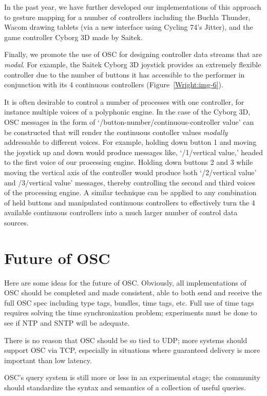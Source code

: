 In the past year, we have further developed our implementations of this approach
to gesture mapping for a number of controllers including the Buchla Thunder,
Wacom drawing tablets (via a new interface using Cycling 74's Jitter), and the
game controller Cyborg 3D made by Saitek.

Finally, we promote the use of OSC for designing controller data streams that
are \textit{modal}.  For example, the Saitek Cyborg 3D joystick provides an
extremely flexible controller due to the number of buttons it has accessible to
the performer in conjunction with its 4 continuous controllers (Figure~\ref{Wright:img-6}).

It
is often desirable to control a number of processes with one controller, for
instance multiple voices of a polyphonic engine.  In the case of the Cyborg 3D,
OSC messages in the form of `/button-number/continuous-controller value' can be
constructed that will render the continuous contoller values \textit{modally}
addressable to different voices.  For example, holding down button 1 and moving
the joystick up and down would produce messages like, `/1/vertical value,' headed
to the first voice of our processing engine.  Holding down buttons 2 and 3 while
moving the vertical axis of the controller would produce both `/2/vertical value'
and /3/vertical value' messages, thereby controlling the second and third voices
of the processing engine.  A similar technique can be applied to any combination
of held buttons and manipulated continuous controllers to effectively turn the 4
available continuous controllers into a much larger number of control data
sources.

\section{Future of OSC}

Here are some ideas for the future of OSC. Obviously, all implementations of OSC should be completed and made consistent, able to both send and receive the full OSC spec including type tags, bundles, time tags, etc.  Full use of time tags requires solving the time synchronization problem; experiments must be done to see if NTP and SNTP will be adequate.

There is no reason that OSC should be so tied to UDP; more systems should support OSC via TCP, especially in situations where guaranteed delivery is more important than low latency.

OSC's query system is still more or less in an experimental stage; the community should standardize the syntax and semantics of a collection of useful queries.

